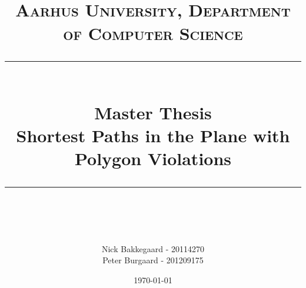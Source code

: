 


\newcommand{\gerth}[1]{\todo[color=black!40]{#1}}
\newcommand{\nick}[1]{\todo[color=green!40]{#1}}
\newcommand{\peter}[1]{\todo[color=blue!40]{#1}}


\newcommand{\horrule}[1]{\rule{\linewidth}{#1}} %


\posttitle{
	\end{center}
}
\title{
	\\
	\normalfont \normalsize 
    \vspace{2cm}
	\textsc{Aarhus University, Department of Computer Science} \\ [25pt] %
	\horrule{0.5pt} \\[0.4cm] %
    \huge Master Thesis \\
    \huge Shortest Paths in the Plane with Polygon Violations 
	\horrule{2pt} \\[0.5cm] %
}

\author{
	Nick Bakkegaard - 20114270\\
	Peter Burgaard - 201209175 
} %

\date{\normalsize\today} %



